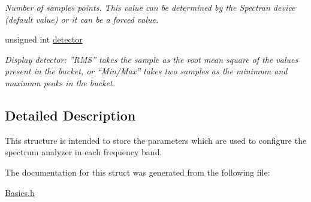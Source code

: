 \begin{DoxyCompactItemize}
\begin{DoxyCompactList}\small\item\em Number of samples points. This value can be determined by the Spectran device (default value) or it can be a forced value. \end{DoxyCompactList}\item 
\mbox{\label{structBandParameters_a37ddad49ed6a8562c878d60081c65188}} 
unsigned int \hyperlink{structBandParameters_a37ddad49ed6a8562c878d60081c65188}{detector}
\begin{DoxyCompactList}\small\item\em Display detector\+: ”\+R\+M\+S” takes the sample as the root mean square of the values present in the bucket, or “\+Min/\+Max” takes two samples as the minimum and maximum peaks in the bucket. \end{DoxyCompactList}\end{DoxyCompactItemize}


\subsection{Detailed Description}
This structure is intended to store the parameters which are used to configure the spectrum analyzer in each frequency band. 

The documentation for this struct was generated from the following file\+:\begin{DoxyCompactItemize}
\item 
\hyperlink{Basics_8h}{Basics.\+h}\end{DoxyCompactItemize}
